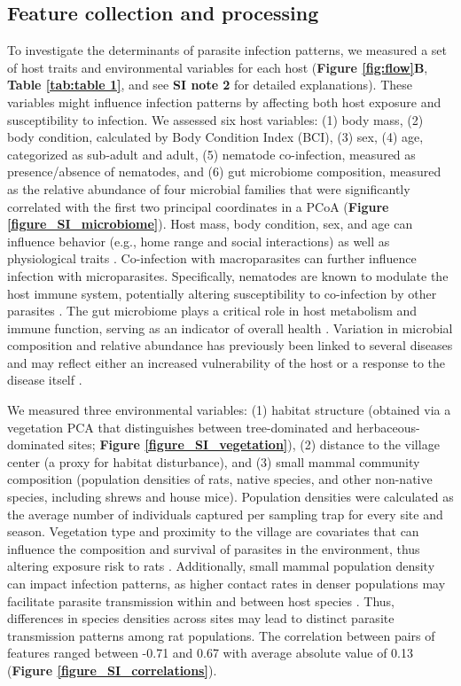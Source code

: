 \documentclass[oneside, a4paper, onecolumn, 11pt]{article}
\begin{document}
\subsection*{Feature collection and processing}
To investigate the determinants of parasite infection patterns, we measured a set of host traits and environmental variables for each host (\textbf{Figure \ref{fig:flow}B}, \textbf{Table \ref{tab:table 1}}, and see \textbf{SI note 2} for detailed explanations). These variables might influence infection patterns by affecting both host exposure and susceptibility to infection. We assessed six host variables: (1) body mass, (2) body condition, calculated by Body Condition Index (BCI), (3) sex, (4) age, categorized as sub-adult and adult, (5) nematode co-infection, measured as presence/absence of nematodes, and (6) gut microbiome composition, measured as the relative abundance of four microbial families that were significantly correlated with the first two principal coordinates in a PCoA (\textbf{Figure \ref{figure_SI_microbiome}}). Host mass, body condition, sex, and age can influence behavior (e.g., home range and social interactions) as well as physiological traits \citep{Grear2009-ch,Cornell2008-cx,Sanchez2018-tf}. Co-infection with macroparasites can further influence infection with microparasites. Specifically, nematodes are known to modulate the host immune system, potentially altering susceptibility to co-infection by other parasites \citep{Mabbott2018-wb,Rodgers2024-hl}. The gut microbiome plays a critical role in host metabolism and immune function, serving as an indicator of overall health \citep{Berg2020-az, Gould2018-kj}. Variation in microbial composition and relative abundance has previously been linked to several diseases and may reflect either an increased vulnerability of the host or a response to the disease itself \citep{Levy2017-ec,Rosshart2017-pu}.

We measured three environmental variables: (1) habitat structure (obtained via a vegetation PCA that distinguishes between tree-dominated and herbaceous-dominated sites; \textbf{Figure \ref{figure_SI_vegetation}}), (2) distance to the village center (a proxy for habitat disturbance), and (3) small mammal community composition (population densities of rats, native species, and other non-native species, including shrews and house mice). Population densities were calculated as the average number of individuals captured per sampling trap for every site and season. Vegetation type and proximity to the village are covariates that can influence the composition and survival of parasites in the environment, thus altering exposure risk to rats \citep{Gottdenker2014-by,Patz2000-cg}. Additionally, small mammal population density can impact infection patterns, as higher contact rates in denser populations may facilitate parasite transmission within and between host species \citep{Begon2002-or,Gajewski2024-wb}. Thus, differences in species densities across sites may lead to distinct parasite transmission patterns among rat populations. The correlation between pairs of features ranged between -0.71 and 0.67 with average absolute value of 0.13 (\textbf{Figure \ref{figure_SI_correlations}}).
\end{document}
